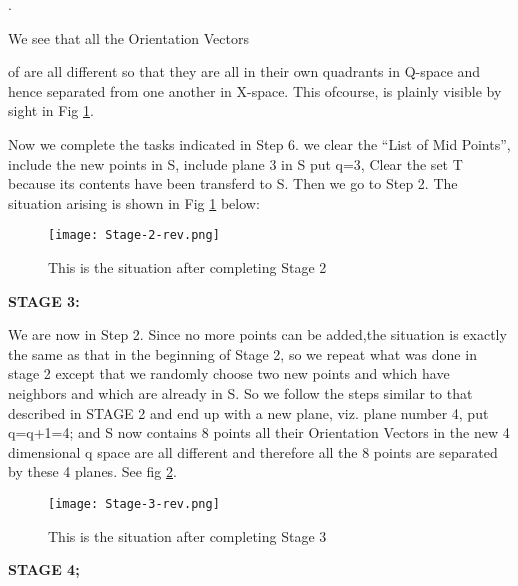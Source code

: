 \documentclass[english]{article}
\begin{document}
 
.

We see that all the Orientation Vectors 

of  are all different so that
they are all in their own quadrants in Q-space and hence separated
from one another in X-space. This ofcourse, is plainly visible by
sight in Fig \ref{fig:fig-d}. 

Now we complete the tasks indicated in Step 6. we clear the ``List
of Mid Points'', include the new points  in S, include
plane 3 in S put q=3, Clear the set T because its contents 
have been transferd to S. Then we go to Step 2. The situation arising
is shown in Fig \ref{fig:fig-d} below: 

\begin{figure}[htp]
 \begin{center}
 
\texttt{[image: Stage-2-rev.png]}
\caption{This is the situation after completing  Stage 2}

\label{fig:fig-d} \end{center}
\end{figure} 


\medskip{}


\medskip{}


\textbf{STAGE 3: }

We are now in Step 2. Since no more points can be added,the situation
is exactly the same as that in the beginning of Stage 2, so we repeat
what was done in stage 2 except that we randomly choose two new points
 and  which have neighbors  and  which
are already in S. So we follow the steps similar to that described
in STAGE 2 and end up with a new plane, viz. plane number 4, put q=q+1=4; and S
now contains 8 points all their Orientation Vectors in the new 4 dimensional
q space are all different and therefore all the 8 points are separated
by these 4 planes. See fig \ref{fig:fig-e}.

\begin{figure}[htp]
 \begin{center}
 
\texttt{[image: Stage-3-rev.png]}
\caption{This is the situation after completing  Stage 3}

\label{fig:fig-e} \end{center}
\end{figure} 





\medskip{}
\medskip{}


\textbf{STAGE 4;}
\end{document}
